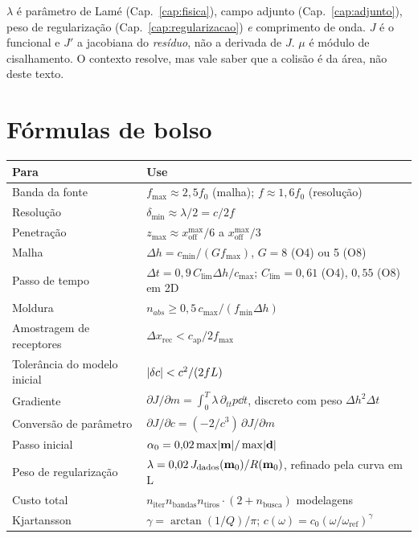 \documentclass[11pt,a4paper,oneside]{report}
\begin{document}
\begin{atencao}
$\lambda$ \'e par\^ametro de Lam\'e (Cap.~\ref{cap:fisica}), campo adjunto
(Cap.~\ref{cap:adjunto}), peso de regulariza\c{c}\~ao
(Cap.~\ref{cap:regularizacao}) \emph{e} comprimento de onda. $J$ \'e o
funcional e $J'$ a jacobiana do \emph{res\'iduo}, n\~ao a derivada de $J$.
$\mu$ \'e m\'odulo de cisalhamento. O contexto resolve, mas vale saber que a
colis\~ao \'e da \'area, n\~ao deste texto.
\end{atencao}

\chapter{F\'ormulas de bolso}

\begin{center}
\begin{longtable}{@{}p{5.3cm}p{9.6cm}@{}}
\toprule
\textbf{Para} & \textbf{Use} \\
\midrule
\endhead
Banda da fonte & $f_{\max} \approx 2{,}5 f_0$ (malha);
  $f \approx 1{,}6 f_0$ (resolu\c{c}\~ao) \\
Resolu\c{c}\~ao & $\delta_{\min} \approx \lambda/2 = c/2f$ \\
Penetra\c{c}\~ao & $z_{\max} \approx x_{\text{off}}^{\max}/6$ a
  $x_{\text{off}}^{\max}/3$ \\
Malha & $\Delta h = c_{\min}/(G f_{\max})$, $G = 8$ (O4) ou 5 (O8) \\
Passo de tempo & $\Delta t = 0{,}9\,C_{\lim}\Delta h/c_{\max}$;
  $C_{\lim} = 0{,}61$ (O4), $0{,}55$ (O8) em 2D \\
Moldura & $n_{abs} \ge 0{,}5\,c_{\max}/(f_{\min}\Delta h)$ \\
Amostragem de receptores & $\Delta x_{\text{rec}} < c_{\text{ap}}/2f_{\max}$ \\
Toler\^ancia do modelo inicial & $\lvert \delta c \rvert < c^{2}/(2 f L)$ \\
Gradiente & $\partial J/\partial m = \int_0^T \lambda\,\partial_{tt}p\dd t$,
  discreto com peso $\Delta h^{2}\Delta t$ \\
Convers\~ao de par\^ametro & $\partial J/\partial c
  = (-2/c^{3})\,\partial J/\partial m$ \\
Passo inicial & $\alpha_0 = 0{,}02\max\lvert \mathbf{m} \rvert/\max\lvert \mathbf{d} \rvert$ \\
Peso de regulariza\c{c}\~ao & $\lambda = 0{,}02\,
  J_{\text{dados}}(\mathbf{m}_0)/R(\mathbf{m}_0)$, refinado pela curva em L \\
Custo total & $n_{\text{iter}} n_{\text{bandas}} n_{\text{tiros}}
  \cdot (2+n_{\text{busca}})$ modelagens \\
Kjartansson & $\gamma = \arctan(1/Q)/\pi$;
  $c(\omega) = c_0(\omega/\omega_{\text{ref}})^{\gamma}$ \\
\bottomrule
\end{longtable}
\end{center}
\end{document}

